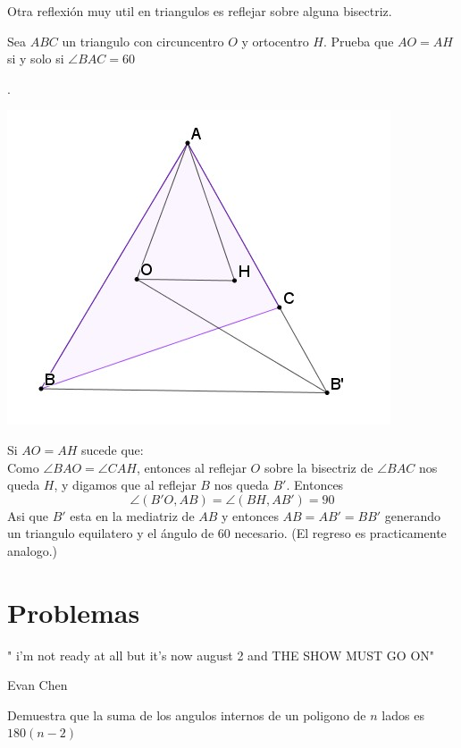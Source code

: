 \documentclass[11pt]{scrartcl}
\newcommand{\thmdifficulty}{0}
\newcommand{\problemdiff}[1]{\renewcommand{\thmdifficulty}{#1}}
\begin{document}
    Otra reflexi\'on muy util en triangulos es reflejar sobre alguna bisectriz. 
    \begin{example}
        Sea $ABC$ un triangulo con circuncentro $O$ y ortocentro $H$. Prueba que $AO=AH$ si y solo si $\angle BAC=60$
    \end{example}
    \begin{soln}
    .
        \begin{center}
            \includegraphics[scale=0.5]{Img16.jpg}
        \end{center}
        Si $AO=AH$ sucede que: \\
        Como $\angle BAO=\angle CAH$, entonces al reflejar $O$ sobre la bisectriz de $\angle BAC$ nos queda $H$, y digamos que al reflejar $B$ nos queda $B'$. Entonces 
        $$\angle (B'O, AB)=\angle (BH, AB')=90$$
        Asi que $B'$ esta en la mediatriz de $AB$ y entonces $AB=AB'=BB'$ generando un triangulo equilatero y el \'angulo de 60 necesario. 
        (El regreso es practicamente analogo.)
    \end{soln}



\newpage
\section{Problemas}
\epigraph{" i'm not ready at all but it's now august 2 and THE SHOW MUST GO ON"
}{Evan Chen}



\problemdiff{0}
\begin{problema}
    Demuestra que la suma de los angulos internos de un poligono de $n$ lados es $180(n-2)$
\end{problema}
\end{document}
